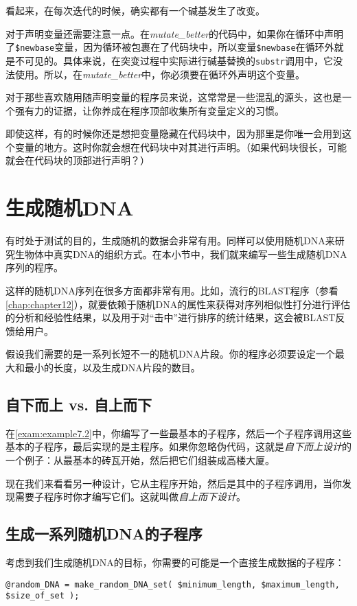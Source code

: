 看起来，在每次迭代的时候，确实都有一个碱基发生了改变。

对于声明变量还需要注意一点。在\textit{mutate\_better}的代码中，如果你在循环中声明了\verb|$newbase|变量，因为循环被包裹在了代码块中，所以变量\verb|$newbase|在循环外就是不可见的。具体来说，在突变过程中实际进行碱基替换的\verb|substr|调用中，它没法使用。所以，在\textit{mutate\_better}中，你必须要在循环外声明这个变量。

对于那些喜欢随用随声明变量的程序员来说，这常常是一些混乱的源头，这也是一个强有力的证据，让你养成在程序顶部收集所有变量定义的习惯。

即使这样，有的时候你还是想把变量隐藏在代码块中，因为那里是你唯一会用到这个变量的地方。这时你就会想在代码块中对其进行声明。（如果代码块很长，可能就会在代码块的顶部进行声明？）

\section{生成随机DNA} 
有时处于测试的目的，生成随机的数据会非常有用。同样可以使用随机DNA来研究生物体中真实DNA的组织方式。在本小节中，我们就来编写一些生成随机DNA序列的程序。

这样的随机DNA序列在很多方面都非常有用。比如，流行的BLAST程序（参看\autoref{chap:chapter12}），就要依赖于随机DNA的属性来获得对序列相似性打分进行评估的分析和经验性结果，以及用于对“击中”进行排序的统计结果，这会被BLAST反馈给用户。

假设我们需要的是一系列长短不一的随机DNA片段。你的程序必须要设定一个最大和最小的长度，以及生成DNA片段的数目。

\subsection{自下而上 vs. 自上而下}
在\autoref{exam:example7.2}中，你编写了一些最基本的子程序，然后一个子程序调用这些基本的子程序，最后实现的是主程序。如果你忽略伪代码，这就是\textit{自下而上设计}的一个例子：从最基本的砖瓦开始，然后把它们组装成高楼大厦。

现在我们来看看另一种设计，它从主程序开始，然后是其中的子程序调用，当你发现需要子程序时你才编写它们。这就叫做\textit{自上而下设计}。

\subsection{生成一系列随机DNA的子程序}
考虑到我们生成随机DNA的目标，你需要的可能是一个直接生成数据的子程序：

\begin{lstlisting}
@random_DNA = make_random_DNA_set( $minimum_length, $maximum_length, $size_of_set );
\end{lstlisting}


